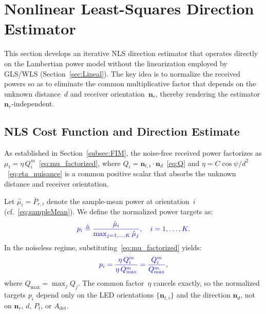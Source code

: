 \documentclass[journal]{IEEEtran}
\newcommand{\added}[1]{{\color{blue}#1}}
\begin{document}
\section{\added{Nonlinear Least-Squares Direction Estimator}}
\label{sec:NoLineal}


\added{This section develops an iterative NLS direction estimator that operates directly on the Lambertian power model without the linearization employed by GLS/WLS (Section~\ref{sec:Lineal}). The key idea is to normalize the received powers so as to eliminate the common multiplicative factor that depends on the unknown distance~$d$ and receiver orientation~$\mathbf{n}_r$, thereby rendering the estimator $\mathbf{n}_r$-independent.}

\added{\subsection{NLS Cost Function and Direction Estimate}}
\added{As established in Section~\ref{subsec:FIM}, the noise-free received power factorizes as $\mu_i = \eta\,Q_i^m$~\eqref{eq:mu_factorized}, where $Q_i = \mathbf{n}_{t,i}\cdot\mathbf{n}_d$~\eqref{eq:Q} and $\eta = C\cos\psi/d^2$~\eqref{eq:eta_nuisance} is a common positive scalar that absorbs the unknown distance and receiver orientation.}

\added{Let $\hat\mu_i = \bar P_{r,i}$ denote the sample-mean power at orientation~$i$ (cf.~\eqref{eq:sampleMean}). We define the normalized power targets as:}
\begin{equation}
\added{p_i \triangleq \frac{\hat\mu_i}{\max_{j=1,\ldots,K}\hat\mu_j}, \quad i=1,\ldots,K.}
\label{eq:p_target}
\end{equation}
\added{In the noiseless regime, substituting~\eqref{eq:mu_factorized} yields:}
\begin{equation}
\added{p_i = \frac{\eta\,Q_i^m}{\eta\,Q_{\max}^m} = \frac{Q_i^m}{Q_{\max}^m},}
\label{eq:p_target_noiseless}
\end{equation}
\added{where $Q_{\max}=\max_j Q_j$. The common factor~$\eta$ cancels exactly, so the normalized targets $p_i$ depend only on the LED orientations $\{\mathbf{n}_{t,i}\}$ and the direction $\mathbf{n}_d$, not on $\mathbf{n}_r$, $d$, $P_t$, or $A_{\mathrm{det}}$.}
\end{document}
